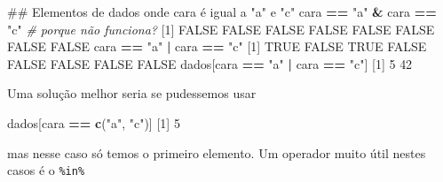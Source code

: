 \documentclass[10pt,a4paper]{book}
\newenvironment{Shaded}{\begin{snugshade}}{\end{snugshade}}
\newcommand{\KeywordTok}[1]{\textcolor[rgb]{0.13,0.29,0.53}{\textbf{#1}}}
\newcommand{\DecValTok}[1]{\textcolor[rgb]{0.00,0.00,0.81}{#1}}
\newcommand{\StringTok}[1]{\textcolor[rgb]{0.31,0.60,0.02}{#1}}
\newcommand{\CommentTok}[1]{\textcolor[rgb]{0.56,0.35,0.01}{\textit{#1}}}
\newcommand{\OtherTok}[1]{\textcolor[rgb]{0.56,0.35,0.01}{#1}}
\newcommand{\OperatorTok}[1]{\textcolor[rgb]{0.81,0.36,0.00}{\textbf{#1}}}
\newcommand{\NormalTok}[1]{#1}
\begin{document}
\begin{Shaded}
\begin{Highlighting}[]
\NormalTok{## Elementos de dados onde cara é igual a "a" e "c"}
\NormalTok{cara }\OperatorTok{==}\StringTok{ "a"} \OperatorTok{&}\StringTok{ }\NormalTok{cara }\OperatorTok{==}\StringTok{ "c"} \CommentTok{# porque não funciona?}
\NormalTok{[}\DecValTok{1}\NormalTok{] }\OtherTok{FALSE} \OtherTok{FALSE} \OtherTok{FALSE} \OtherTok{FALSE} \OtherTok{FALSE} \OtherTok{FALSE} \OtherTok{FALSE} \OtherTok{FALSE}
\NormalTok{cara }\OperatorTok{==}\StringTok{ "a"} \OperatorTok{|}\StringTok{ }\NormalTok{cara }\OperatorTok{==}\StringTok{ "c"}
\NormalTok{[}\DecValTok{1}\NormalTok{]  }\OtherTok{TRUE} \OtherTok{FALSE}  \OtherTok{TRUE} \OtherTok{FALSE} \OtherTok{FALSE} \OtherTok{FALSE} \OtherTok{FALSE} \OtherTok{FALSE}
\NormalTok{dados[cara }\OperatorTok{==}\StringTok{ "a"} \OperatorTok{|}\StringTok{ }\NormalTok{cara }\OperatorTok{==}\StringTok{ "c"}\NormalTok{]}
\NormalTok{[}\DecValTok{1}\NormalTok{]  }\DecValTok{5} \DecValTok{42}
\end{Highlighting}
\end{Shaded}

Uma solução melhor seria se pudessemos usar

\begin{Shaded}
\begin{Highlighting}[]
\NormalTok{dados[cara }\OperatorTok{==}\StringTok{ }\KeywordTok{c}\NormalTok{(}\StringTok{"a"}\NormalTok{, }\StringTok{"c"}\NormalTok{)]}
\NormalTok{[}\DecValTok{1}\NormalTok{] }\DecValTok{5}
\end{Highlighting}
\end{Shaded}

mas nesse caso só temos o primeiro elemento. Um operador muito útil
nestes casos é o \texttt{\%in\%}

\begin{Shaded}
\end{Shaded}
\end{document}
